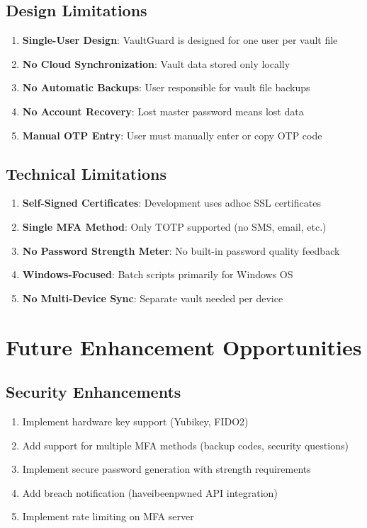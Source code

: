 \documentclass[12pt,a4paper]{report}
\begin{document}
\subsection{Design Limitations}

\begin{enumerate}
    \item \textbf{Single-User Design}: VaultGuard is designed for one user per vault file
    \item \textbf{No Cloud Synchronization}: Vault data stored only locally
    \item \textbf{No Automatic Backups}: User responsible for vault file backups
    \item \textbf{No Account Recovery}: Lost master password means lost data
    \item \textbf{Manual OTP Entry}: User must manually enter or copy OTP code
\end{enumerate}

\subsection{Technical Limitations}

\begin{enumerate}
    \item \textbf{Self-Signed Certificates}: Development uses adhoc SSL certificates
    \item \textbf{Single MFA Method}: Only TOTP supported (no SMS, email, etc.)
    \item \textbf{No Password Strength Meter}: No built-in password quality feedback
    \item \textbf{Windows-Focused}: Batch scripts primarily for Windows OS
    \item \textbf{No Multi-Device Sync}: Separate vault needed per device
\end{enumerate}

\section{Future Enhancement Opportunities}

\subsection{Security Enhancements}

\begin{enumerate}
    \item Implement hardware key support (Yubikey, FIDO2)
    \item Add support for multiple MFA methods (backup codes, security questions)
    \item Implement secure password generation with strength requirements
    \item Add breach notification (haveibeenpwned API integration)
    \item Implement rate limiting on MFA server
\end{enumerate}
\end{document}
